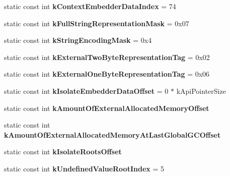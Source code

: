 \begin{DoxyCompactItemize}
\item 
\hypertarget{classv8_1_1internal_1_1_internals_afb65846499ec5f68172e4b2e8301a493}{}static const int {\bfseries k\+Context\+Embedder\+Data\+Index} = 74\label{classv8_1_1internal_1_1_internals_afb65846499ec5f68172e4b2e8301a493}

\item 
\hypertarget{classv8_1_1internal_1_1_internals_a5c39a86b30463928ea719def66916507}{}static const int {\bfseries k\+Full\+String\+Representation\+Mask} = 0x07\label{classv8_1_1internal_1_1_internals_a5c39a86b30463928ea719def66916507}

\item 
\hypertarget{classv8_1_1internal_1_1_internals_a1927ac3def13a57e03025e62ca46d1c5}{}static const int {\bfseries k\+String\+Encoding\+Mask} = 0x4\label{classv8_1_1internal_1_1_internals_a1927ac3def13a57e03025e62ca46d1c5}

\item 
\hypertarget{classv8_1_1internal_1_1_internals_a73faf917416d2519b65c7255e77a74ce}{}static const int {\bfseries k\+External\+Two\+Byte\+Representation\+Tag} = 0x02\label{classv8_1_1internal_1_1_internals_a73faf917416d2519b65c7255e77a74ce}

\item 
\hypertarget{classv8_1_1internal_1_1_internals_ac789a0a139ccbacec0c5fb2d79427305}{}static const int {\bfseries k\+External\+One\+Byte\+Representation\+Tag} = 0x06\label{classv8_1_1internal_1_1_internals_ac789a0a139ccbacec0c5fb2d79427305}

\item 
\hypertarget{classv8_1_1internal_1_1_internals_ad722bf4760df09958cd1062db4a5524c}{}static const int {\bfseries k\+Isolate\+Embedder\+Data\+Offset} = 0 $\ast$ k\+Api\+Pointer\+Size\label{classv8_1_1internal_1_1_internals_ad722bf4760df09958cd1062db4a5524c}

\item 
static const int {\bfseries k\+Amount\+Of\+External\+Allocated\+Memory\+Offset}
\item 
static const int {\bfseries k\+Amount\+Of\+External\+Allocated\+Memory\+At\+Last\+Global\+G\+C\+Offset}
\item 
static const int {\bfseries k\+Isolate\+Roots\+Offset}
\item 
\hypertarget{classv8_1_1internal_1_1_internals_a7281ff0eafed559e64613465b1a03296}{}static const int {\bfseries k\+Undefined\+Value\+Root\+Index} = 5\label{classv8_1_1internal_1_1_internals_a7281ff0eafed559e64613465b1a03296}


\end{DoxyCompactItemize}
